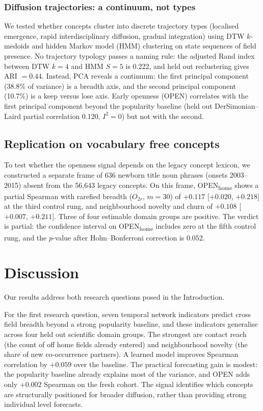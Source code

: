 \documentclass[11pt,letterpaper]{article}
\begin{document}
\subsubsection{Diffusion trajectories: a continuum, not types}

We tested whether concepts cluster into discrete trajectory types (localised
emergence, rapid interdisciplinary diffusion, gradual integration) using DTW
$k$-medoids and hidden Markov model (HMM) clustering on state sequences of
field presence. No trajectory typology passes a naming rule: the adjusted Rand
index between DTW $k = 4$ and HMM $S = 5$ is 0.222, and held out reclustering
gives ARI $= 0.44$. Instead, PCA reveals a continuum: the first principal
component (38.8\% of variance) is a breadth axis, and the second principal
component (10.7\%) is a keep versus lose axis. Early openness (OPEN) correlates
with the first principal component beyond the popularity baseline (held out
DerSimonian--Laird partial correlation 0.120, $I^2 = 0$) but not with the
second.

\subsection{Replication on vocabulary free concepts}

To test whether the openness signal depends on the legacy concept lexicon, we
constructed a separate frame of 636 newborn title noun phrases (onsets
2003--2015) absent from the 56,643 legacy concepts. On this frame,
OPEN\textsubscript{home} shows a partial Spearman with rarefied breadth
($O_{2r}$, $m = 30$) of $+0.117$ [$+0.020$, $+0.218$] at the third control
rung, and neighbourhood novelty and churn of $+0.108$ [$+0.007$, $+0.211$].
Three of four estimable domain groups are positive. The verdict is partial: the
confidence interval on OPEN\textsubscript{home} includes zero at the fifth
control rung, and the $p$-value after Holm--Bonferroni correction is 0.052.

\section{Discussion}
\label{sec:discussion}

Our results address both research questions posed in the Introduction.

For the first research question, seven temporal network indicators predict
cross field breadth beyond a strong popularity baseline, and these indicators
generalise across four held out scientific domain groups. The strongest are contact reach (the count of off home
fields already entered) and neighbourhood novelty (the share of new
co-occurrence partners). A learned model improves Spearman correlation by
$+0.059$ over the baseline. The practical forecasting gain is modest: the popularity baseline already
explains most of the variance, and OPEN adds only $+0.002$ Spearman on the
fresh cohort. The signal identifies which concepts are structurally positioned
for broader diffusion, rather than providing strong individual level forecasts.
\end{document}
